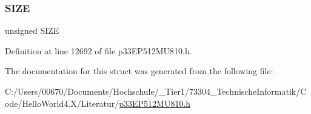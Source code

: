 \subsubsection{\texorpdfstring{S\+I\+ZE}{SIZE}}
{\footnotesize\ttfamily unsigned S\+I\+ZE}



Definition at line 12692 of file p33\+E\+P512\+M\+U810.\+h.



The documentation for this struct was generated from the following file\+:\begin{DoxyCompactItemize}
\item 
C\+:/\+Users/00670/\+Documents/\+Hochschule/\+\_\+\+Tier1/73304\+\_\+\+Technische\+Informatik/\+Code/\+Hello\+World4.\+X/\+Literatur/\hyperlink{p33_e_p512_m_u810_8h}{p33\+E\+P512\+M\+U810.\+h}\end{DoxyCompactItemize}
